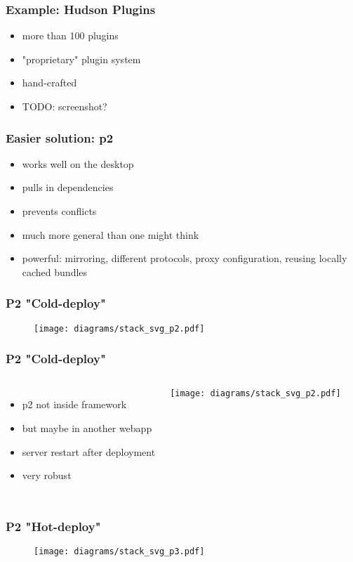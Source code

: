 \documentclass{beamer}
\begin{document}
\begin{frame}
  \frametitle{Example: Hudson Plugins}
  \begin{itemize}
  \item more than 100 plugins\pause
  \item "proprietary" plugin system\pause
  \item hand-crafted\pause
  \item TODO: screenshot?
  \end{itemize}   
\end{frame}

\begin{frame}
  \frametitle{Easier solution: p2}
  \begin{itemize}
  \item works well on the desktop\pause
  \item pulls in dependencies\pause
  \item prevents conflicts\pause
  \item much more general than one might think\pause
  \item powerful: mirroring, different protocols, proxy configuration, reusing locally cached bundles
  \end{itemize}   
\end{frame}

\begin{frame}
  \frametitle{P2 "Cold-deploy"}
\begin{figure}
   \texttt{[image: diagrams/stack\_svg\_p2.pdf]}
\end{figure}
\end{frame}

\begin{frame}
  \frametitle{P2 "Cold-deploy"}
\begin{columns}
\column{1.5in}
  \begin{itemize}
  \item p2 not inside framework\pause
  \item but maybe in another webapp\pause
  \item server restart after deployment\pause
  \item very robust
  \end{itemize}      
\column{1.5in}
\texttt{[image: diagrams/stack\_svg\_p2.pdf]}
\end{columns}
\end{frame}

\begin{frame}
  \frametitle{P2 "Hot-deploy"}
\begin{figure}
   \texttt{[image: diagrams/stack\_svg\_p3.pdf]}
\end{figure}
\end{frame}
\end{document}
